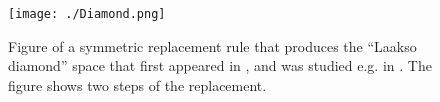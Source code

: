 \documentclass[12pt]{article}
\begin{document}
\begin{figure}[ht]
\centering
\texttt{[image: ./Diamond.png]}
\caption{Figure of a symmetric replacement rule that produces the ``Laakso diamond'' space that first appeared in \protect\cite{Laakso}, and was studied e.g. in \protect\cite{Yair, LangPlaut}. The figure shows two steps of the replacement.}
\end{figure}
\end{document}
